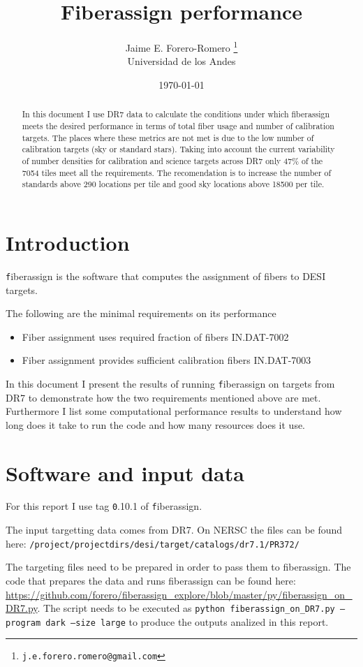 \documentclass{article}
\title{Fiberassign performance}
\author{Jaime E. Forero-Romero \footnote{{\texttt{j.e.forero.romero@gmail.com}}}\\Universidad de los Andes}
\date{\today}
\begin{document}
\maketitle
\begin{abstract}
In this document I use DR7 data to calculate the conditions under
which fiberassign meets the desired performance in terms of total
fiber usage and number of calibration targets. 
The places where these metrics are not met is due to the low number of
calibration targets (sky or standard stars).  
Taking into account the current variability of number densities for
calibration and science targets across DR7 only $47\%$ of the 7054
tiles meet all the requirements. 
The recomendation is to increase the number of standards above 290
locations per tile and good sky locations above 18500 per tile.
\end{abstract}

\section{Introduction}
{\texttt fiberassign} is the software that computes the assignment of
fibers to DESI targets. 

The following are the minimal requirements on its performance
\begin{itemize}
\item Fiber assignment uses required fraction of fibers IN.DAT-7002
\item Fiber assignment provides sufficient calibration fibers IN.DAT-7003
\end{itemize}

In this document I present the results of running {\texttt
  fiberassign} on targets from DR7 to demonstrate how the two
requirements mentioned above are met. 
Furthermore I list some computational performance results to
understand how long does it take to run the code and how many
resources does it use.

\section{Software and input data}

For this report I use tag {\texttt 0.10.1} of {\texttt fiberassign}. 

The input targetting data comes from DR7. On NERSC the files can be found here:
{\texttt{/project/projectdirs/desi/target/catalogs/dr7.1/PR372/}}

The targeting files need to be prepared in order to pass them to
fiberassign.
The code that prepares the data and runs fiberassign can be found
here:
\url{https://github.com/forero/fiberassign_explore/blob/master/py/fiberassign_on_DR7.py}.
The script needs to be executed as {\texttt{python fiberassign\_on\_DR7.py --program dark
--size large}} to produce the outputs analized in this report.
\end{document}

